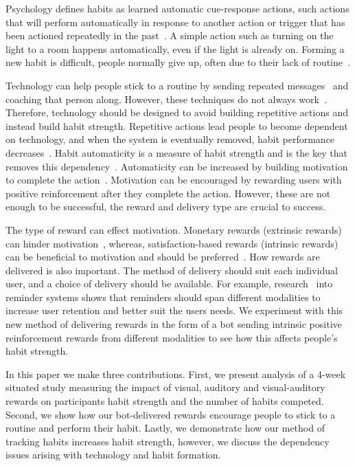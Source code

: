 \documentclass{scaffold/sigchi}
\begin{document}
Psychology defines habits as learned automatic cue-response actions, such actions that will perform automatically in response to another action or trigger that has been actioned repeatedly in the past~\cite{article_the_habitual_consumer}. A simple action such as turning on the light to a room happens automatically, even if the light is already on. Forming a new habit is difficult, people normally give up, often due to their lack of routine~\cite{article_promoting_habit_formation, article_the_habitual_consumer}.

Technology can help people stick to a routine by sending repeated messages~\cite{chi_crowd_designed_motivation} and coaching that person along. However, these techniques do not always work~\cite{coaching_not_that_good}. Therefore, technology should be designed to avoid building repetitive actions and instead build habit strength. Repetitive actions lead people to become dependent on technology, and when the system is eventually removed, habit performance decreases~\cite{article_dont_kick_habit}. Habit automaticity is a measure of habit strength and is the key that removes this dependency~\cite{article_beyond_self_tracking_designing_apps}. Automaticity can be increased by building motivation to complete the action~\cite{article_a_self_efficacy, article_meta_analytic_review_intrinsic_motivation}.
Motivation can be encouraged by rewarding users with positive reinforcement after they complete the action.
However, these are not enough to be successful, the reward and delivery type are crucial to success.

The type of reward can effect motivation. Monetary rewards (extrinsic rewards) can hinder motivation~\cite{article_meta_analytic_review_intrinsic_motivation}, whereas, satisfaction-based rewards (intrinsic rewards) can be beneficial to motivation and should be preferred~\cite{article_meta_analytic_review_intrinsic_motivation}.
How rewards are delivered is also important. The method of delivery should suit each individual user, and a choice of delivery should be available. For example, research~\cite{article_user_centred_multimodal_reminders} into reminder systems shows that reminders should span different modalities to increase user retention and better suit the users needs.
We experiment with this new method of delivering rewards in the form of a bot sending intrinsic positive reinforcement rewards from different modalities to see how this affects people's habit strength.

In this paper we make three contributions. First, we present analysis of a 4-week situated study measuring the impact of visual, auditory and visual-auditory rewards on participants habit strength and the number of habits competed. Second, we show how our bot-delivered rewards encourage people to stick to a routine and perform their habit. Lastly, we demonstrate how our method of tracking habits increases habit strength, however, we discuss the dependency issues arising with technology and habit formation.
\end{document}
